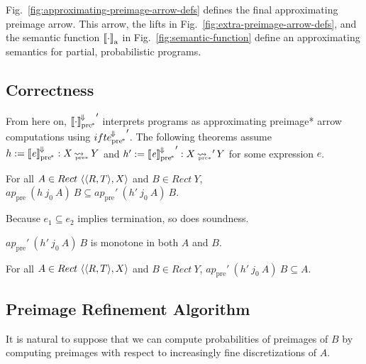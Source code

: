 \documentclass{llncs}
\newcommand{\figref}[1]{Fig.~\ref{#1}}
\newcommand{\arrow}{\rightsquigarrow}
\newcommand{\conv}{^{\mspace{-2mu}\Downarrow\mspace{-2mu}}}
\newcommand{\meaningofconv}[1]{\left\llbracket{#1}\right\rrbracket\conv}
\newcommand{\arrowconvif}{\ensuremath{ifte\conv}}
\newcommand{\gen}{_\mathrm{a}}
\newcommand{\pre}{_\mathrm{pre}}
\newcommand{\ppre}{_\mathrm{pre^{\mspace{-2mu}*}}}
\DeclareMathOperator{\ppreto}{\arrow_{\mspace{-19mu}_{\mathrm{pre*}}}}
\newcommand{\convifppre}{\arrowconvif\ppre}
\begin{document}
\figref{fig:approximating-preimage-arrow-defs} defines the final approximating preimage arrow.
This arrow, the lifts in \figref{fig:extra-preimage-arrow-defs}, and the semantic function $\meaningof{\cdot}\gen$ in \figref{fig:semantic-function} define an approximating semantics for partial, probabilistic programs.

\subsection{Correctness}

From here on, ${\meaningof{\cdot}\conv\ppre}'$ interprets programs as approximating preimage* arrow computations using ${\convifppre}'$.
The following theorems assume $h := \meaningofconv{\mathit{e}}\ppre : X \ppreto Y$ and $h' := {\meaningofconv{\mathit{e}}\ppre}' : X \ppreto' Y$ for some expression $\mathit{e}$.

\begin{theorem}[soundness]
\label{thm:approximation}
For all $A \in Rect~\langle{\langle{R,T}\rangle,X}\rangle$ and $B \in Rect~Y$, $ap\pre~(h~j_0~A)~B \subseteq ap\pre'~(h'~j_0~A)~B$.%
\end{theorem}

Because $\mathit{e}_1 \subseteq \mathit{e}_2$ implies termination, so does soundness.

\begin{theorem}[monotonicity]
\label{thm:monotonicity}
$ap\pre'~(h'~j_0~A)~B$ is monotone in both $A$ and $B$.%
\end{theorem}

\begin{theorem}[decreasing]
\label{thm:decreasing}
For all $A \in Rect~\langle{\langle{R,T}\rangle,X}\rangle$ and $B \in Rect~Y$, $ap\pre'~(h'~j_0~A)~B \subseteq A$.%
\end{theorem}

\subsection{Preimage Refinement Algorithm}
\label{sec:discretization}

It is natural to suppose that we can compute probabilities of preimages of $B$ by computing preimages with respect to increasingly fine discretizations of $A$.
\end{document}

